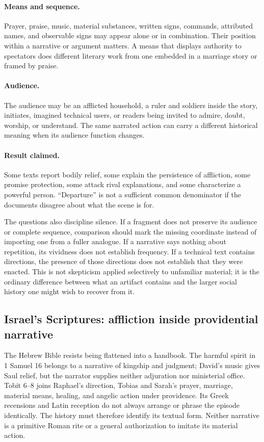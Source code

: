 \paragraph{Means and sequence.} Prayer, praise, music, material substances, written
signs, commands, attributed names, and observable signs may appear alone or in
combination. Their position within a narrative or argument matters. A means
that displays authority to spectators does different literary work from one
embedded in a marriage story or framed by praise.

\paragraph{Audience.} The audience may be an afflicted household, a ruler and
soldiers inside the story, initiates, imagined technical users, or readers
being invited to admire, doubt, worship, or understand. The same narrated
action can carry a different historical meaning when its audience function
changes.

\paragraph{Result claimed.} Some texts report bodily relief, some explain the
persistence of affliction, some promise protection, some attack rival
explanations, and some characterize a powerful person. ``Departure'' is not a
sufficient common denominator if the documents disagree about what the scene
is for.

The questions also discipline silence. If a fragment does not preserve its
audience or complete sequence, comparison should mark the missing coordinate
instead of importing one from a fuller analogue. If a narrative says nothing
about repetition, its vividness does not establish frequency. If a technical
text contains directions, the presence of those directions does not establish
that they were enacted. This is not skepticism applied selectively to
unfamiliar material; it is the ordinary difference between what an artifact
contains and the larger social history one might wish to recover from it.

\subsection{Israel's Scriptures: affliction inside providential narrative}

The Hebrew Bible resists being flattened into a handbook. The harmful spirit
in 1 Samuel 16 belongs to a narrative of kingship and judgment; David's music
gives Saul relief, but the narrator supplies neither adjuration nor ministerial
office. Tobit 6--8 joins Raphael's direction, Tobias and Sarah's prayer,
marriage, material means, healing, and angelic action under providence. Its
Greek recensions and Latin reception do not always arrange or phrase the
episode identically. The history must therefore identify its textual form.
Neither narrative is a primitive Roman rite or a general authorization to
imitate its material action.


